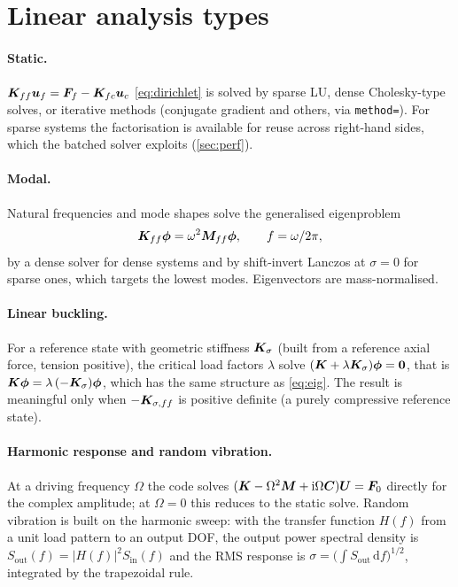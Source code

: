 \section{Linear analysis types}\label{sec:analysis}

\paragraph{Static.}
$\bm{K}_{ff}\bm{u}_f=\bm{F}_f-\bm{K}_{fc}\bm{u}_c$ \eqref{eq:dirichlet} is solved by sparse LU, dense Cholesky-type solves, or iterative methods (conjugate gradient and others, via \texttt{method=}).
For sparse systems the factorisation is available for reuse across right-hand sides, which the batched solver exploits (\cref{sec:perf}).

\paragraph{Modal.}
Natural frequencies and mode shapes solve the generalised eigenproblem
\begin{equation}
  \bm{K}_{ff}\bm\phi=\omega^2\bm{M}_{ff}\bm\phi,\qquad f=\omega/2\pi,
  \label{eq:eig}
\end{equation}
by a dense solver for dense systems and by shift-invert Lanczos at $\sigma=0$ for sparse ones, which targets the lowest modes. Eigenvectors are mass-normalised.

\paragraph{Linear buckling.}
For a reference state with geometric stiffness $\bm{K}_\sigma$ (built from a reference axial force, tension positive), the critical load factors $\lambda$ solve
$(\bm{K}+\lambda\bm{K}_\sigma)\bm\phi=\bm 0$, that is $\bm{K}\bm\phi=\lambda\,(-\bm{K}_\sigma)\bm\phi$, which has the same structure as \eqref{eq:eig}.
The result is meaningful only when $-\bm{K}_{\sigma,ff}$ is positive definite (a purely compressive reference state).

\paragraph{Harmonic response and random vibration.}
At a driving frequency $\Omega$ the code solves $(\bm{K}-\Omega^2\bm{M}+\mathrm i\Omega\bm{C})\bm U=\bm F_0$ directly for the complex amplitude; at $\Omega=0$ this reduces to the static solve.
Random vibration is built on the harmonic sweep: with the transfer function $H(f)$ from a unit load pattern to an output DOF, the output power spectral density is
$S_{\mathrm{out}}(f)=|H(f)|^2S_{\mathrm{in}}(f)$ and the RMS response is $\sigma=\bigl(\int S_{\mathrm{out}}\,\mathrm df\bigr)^{1/2}$, integrated by the trapezoidal rule.

